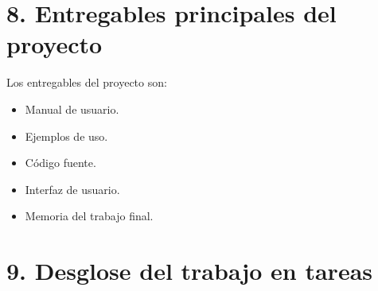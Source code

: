 \documentclass[
11pt, %
]{charter}
\begin{document}
\section{8. Entregables principales del proyecto}
\label{sec:entregables}

Los entregables del proyecto son:

\begin{itemize}
	\item Manual de usuario.
	\item Ejemplos de uso.
	\item Código fuente.
	\item Interfaz de usuario.
	\item Memoria del trabajo final.
\end{itemize}


\section{9. Desglose del trabajo en tareas}
\label{sec:wbs}
\end{document}
